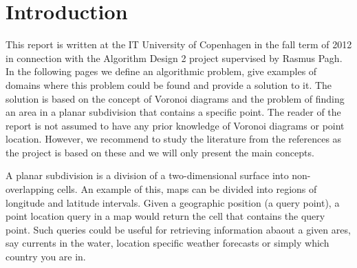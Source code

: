 


\setcounter{page}{1}
\section{Introduction}
\label{introduction}
This report is written at the IT University of Copenhagen in the fall term of 2012 in connection with the Algorithm Design 2 project supervised by Rasmus Pagh. In the following pages we define an algorithmic problem, give examples of domains where this problem could be found and provide a solution to it. The solution is based on the concept of Voronoi diagrams and the problem of finding an area in a planar subdivision that contains a specific point.
The reader of the report is not assumed to have any prior knowledge of Voronoi diagrams or point location. However, we recommend to study the literature from the references as the project is based on these and we will only present the main concepts.

A planar subdivision is a division of a two-dimensional surface into non-overlapping cells. An example of this, maps can be divided into regions of longitude and latitude intervals. Given a geographic position (a query point), a point location query in a map would return the cell that contains the query point. Such queries could be useful for retrieving information abaout a given ares, say currents in the water, location specific weather forecasts or simply which country you are in. 

